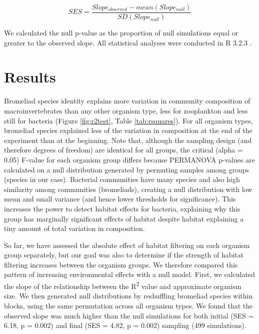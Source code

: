 \[SES = \frac{Slope_{observed} - mean(Slope_{null})}{SD(Slope_{null})}\]

We calculated the null p-value as the proportion of null simulations
equal or greater to the observed slope. All statistical analyses were
conducted in R 3.2.3 \citep{rcore}.

\section{Results}\label{results}

Bromeliad species identity explains more variation in community
composition of macroinvertebrates than any other organism type, less for
zooplankton and less still for bacteria (Figure \ref{fig:r2test}, Table \ref{tab:rsquares}). For all
organism types, bromeliad species explained less of the variation in
composition at the end of the experiment than at the beginning. Note
that, although the sampling design (and therefore degrees of freedom)
are identical for all groups, the critical (alpha = 0.05) F-value for
each organism group differs because PERMANOVA p-values are calculated on
a null distribution generated by permuting samples among groups (species
in our case). Bacterial communities have many species and also high
similarity among communities (bromeliads), creating a null distribution
with low mean and small variance (and hence lower thresholds for
significance). This increases the power to detect habitat effects for
bacteria, explaining why this group has marginally significant effects
of habitat despite habitat explaining a tiny amount of total variation
in composition.

So far, we have assessed the absolute effect of habitat filtering on
each organism group separately, but our goal was also to determine if
the strength of habitat filtering increases between the organism groups.
We therefore compared this pattern of increasing environmental effects
with a null model. First, we calculated the slope of the relationship
between the R\textsuperscript{2} value and approximate organism size. We
then generated null distributions by reshuffling bromeliad species
within blocks, using the same permutation across all organism types. We
found that the observed slope was much higher than the null simulations
for both initial (SES = 6.18, p = 0.002) and final (SES = 4.82, p =
0.002) sampling (499 simulations).


